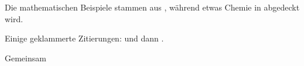 \documentclass{article}
\begin{document}
Die mathematischen Beispiele stammen aus \citet{Nightmind2001}, während etwas
Chemie in \citet{Clear2018} abgedeckt wird.

Einige geklammerte Zitierungen: \citep{Nightmind2001} und dann
\citep[S.~56]{Clear2018}.

\citep[Siehe][Seiten~45--48]{Nightmind2001}

Gemeinsam \citep{Nightmind2001, Clear2018}



\end{document}
